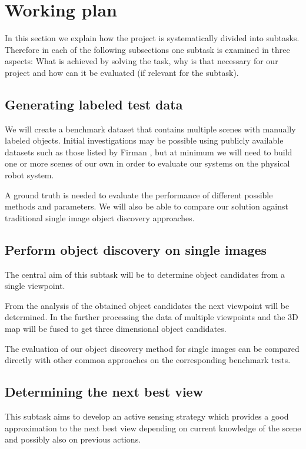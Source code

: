 \documentclass[a4paper,11pt,english]{article}
\begin{document}
\section{Working plan}\label{workingplan}
In this section we explain how the project is systematically divided into subtasks.
Therefore in each of the following subsections one subtask is examined in three aspects: What is achieved by solving the task, why is that necessary for our project and how can it be evaluated (if relevant for the subtask).

\subsection{Generating labeled test data}
We will create a benchmark dataset that contains multiple scenes with manually labeled objects. Initial investigations may be possible using publicly available datasets such as those listed by Firman \cite{firman2016}, but at minimum we will need to build one or more scenes of our own in order to evaluate our systems on the physical robot system.

A ground truth is needed to evaluate the performance of different possible methods and parameters.
We will also be able to compare our solution against traditional single image object discovery approaches.

\subsection{Perform object discovery on single images}
The central aim of this subtask will be to determine object candidates from a single viewpoint.

From the analysis of the obtained object candidates the next viewpoint will be determined.
In the further processing the data of multiple viewpoints and the 3D map will be fused to get three dimensional object candidates.

The evaluation of our object discovery method for single images can be compared directly with other common approaches on the corresponding benchmark tests.

\subsection{Determining the next best view}
This subtask aims to develop an active sensing strategy which provides a good approximation to the next best view depending on current knowledge of the scene and possibly also on previous actions.
\end{document}

